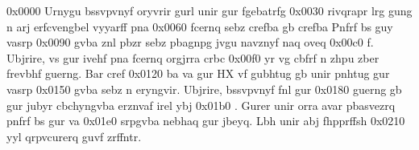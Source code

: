 0x0000 Urnygu bssvpvnyf oryvrir gurl unir gur fgebatrfg
0x0030  rivqrapr lrg gung n arj erfcvengbel vyyarff pna
0x0060  fcernq sebz crefba gb crefba Pnfrf bs guy vasrp
0x0090 gvba znl pbzr sebz pbagnpg jvgu navznyf naq oveq
0x00c0 f. Ubjrire, vs gur ivehf pna fcernq orgjrra crbc
0x00f0 yr vg cbfrf n zhpu zber frevbhf guerng. Bar cref
0x0120 ba va gur HX vf gubhtug gb unir pnhtug gur vasrp
0x0150 gvba sebz n eryngvir. Ubjrire, bssvpvnyf fnl gur
0x0180  guerng gb gur jubyr cbchyngvba erznvaf irel ybj
0x01b0 . Gurer unir orra avar pbasvezrq pnfrf bs gur va
0x01e0 srpgvba nebhaq gur jbeyq. Lbh unir abj fhpprffsh
0x0210 yyl qrpvcurerq guvf zrffntr.
